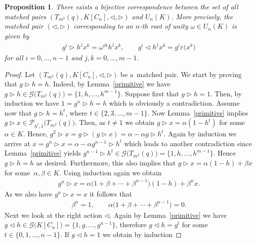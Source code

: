 \documentclass[pdftex]{sigma}
\numberwithin{equation}{section}
\newtheorem{Proposition}[Theorem]{Proposition}
 { \theoremstyle{definition}
\newtheorem{Example}[Theorem]{Example}
\newtheorem{Remark}[Theorem]{Remark} }
\begin{document}
\begin{Proposition} \label{mapex1}
There exists a bijective correspondence between the set of all matched pairs $(T_{m^{2}}(q), K[C_n], \triangleleft, \triangleright)$ and $U_n (K)$. More precisely, the matched pair $(\triangleleft, \triangleright)$ corresponding to an $n$-th root of unity $\omega \in U_n (K)$ is given by
\begin{gather}\label{mp}
g^{i} \triangleright h^{j} x^{k} = \omega^{ik} h^{j} x^{k}, \qquad g^{i} \triangleleft h^{j} x^{k} = g^{i} \varepsilon\big(x^{k}\big)
\end{gather}
for all $i = 0,\dots, n-1$ and $j, k = 0,\dots, m-1$.
\end{Proposition}

\begin{proof} Let $(T_{m^{2}}(q), K[C_n], \triangleleft, \triangleright)$ be a~matched pair. We start by proving that $g \triangleright h = h$.
Indeed, by Lemma~\ref{primitive} we have $g \triangleright h \in \mathcal{G}\big(T_{m^{2}}(q)\big) = \{1, h,\dots,h^{m-1}\}$. Suppose first that $g \triangleright h = 1$. Then, by induction we have $1 = g^{n} \triangleright h = h$ which is obviously a contradiction. Assume now that $g \triangleright h = h^{t}$, where $t \in \{2, 3,\dots, m-1\}$. Now Lemma~\ref{primitive} implies $g \triangleright x \in \mathcal{P}_{h^{t}, 1}\big(T_{m^{2}}(q)\big)$. Then, as $t \neq 1$ we obtain $g \triangleright x = \alpha(1-h^{t})$ for some $\alpha \in K$. Hence, $g^{2} \triangleright x = g \triangleright (g \triangleright x) = \alpha - \alpha g \triangleright h^{t}$. Again by induction we arrive at $x = g^{n} \triangleright x = \alpha - \alpha g^{n-1} \triangleright h^{t}$ which leads to another contradiction since Lemma~\ref{primitive} yields $g^{n-1} \triangleright h^{t} \in \mathcal{G}\big(T_{m^{2}}(q)\big) = \{1, h,\dots,h^{m-1}\}$. Hence $g \triangleright h = h$ as desired. Furthermore, this
also implies that $g \triangleright x = \alpha(1-h)+ \beta x$ for some~$\alpha, \beta \in K$. Using induction again we obtain
\begin{gather*}
g^{n} \triangleright x = \alpha\big(1 + \beta + \cdots + \beta^{n-1}\big) (1-h) + \beta^{n} x.
\end{gather*}
As we also have $g^{n} \triangleright x = x$ it follows that
\begin{gather*}
\beta^{n} = 1, \qquad \alpha\big(1 + \beta + \cdots + \beta^{n-1}\big)=0.
\end{gather*}
Next we look at the right action $\triangleleft$. Again by Lemma~\ref{primitive} we have $g \triangleleft h \in \mathcal{G}\big(K[C_n]\big) = \{1, g,\dots, g^{n-1}\}$, therefore $g \triangleleft h = g^{t}$ for some $t \in \{0,1, \dots, n-1\}$. If $g \triangleleft h = 1$ we obtain by induction

\end{proof}
\end{document}

